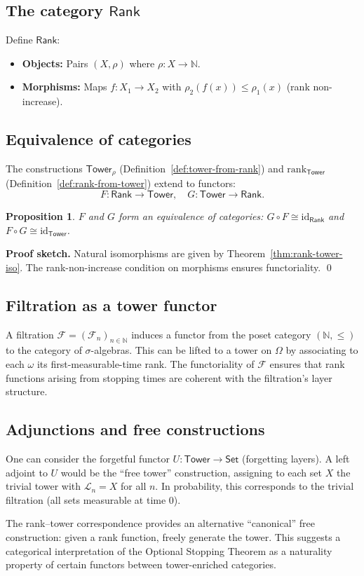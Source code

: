 \documentclass[11pt]{article}
\newtheorem{proposition}[theorem]{Proposition}
\theoremstyle{definition}
\theoremstyle{remark}
\newcommand{\layer}{\mathcal{L}}
\newcommand{\rank}{\mathrm{rank}}
\newcommand{\Tower}{\mathsf{Tower}}
\newcommand{\Filtration}{\mathcal{F}}
\newcommand{\NN}{\mathbb{N}}
\begin{document}
\subsection{The category $\mathsf{Rank}$}

Define $\mathsf{Rank}$:
\begin{itemize}
\item \textbf{Objects:} Pairs $(X, \rho)$ where $\rho: X \to \NN$.
\item \textbf{Morphisms:} Maps $f: X_1 \to X_2$ with $\rho_2(f(x)) \leq \rho_1(x)$ (rank non-increase).
\end{itemize}

\subsection{Equivalence of categories}

The constructions $\Tower_\rho$ (Definition~\ref{def:tower-from-rank}) and $\rank_\Tower$ (Definition~\ref{def:rank-from-tower}) extend to functors:
\[
F: \mathsf{Rank} \to \mathsf{Tower}, \quad G: \mathsf{Tower} \to \mathsf{Rank}.
\]

\begin{proposition}
\label{prop:equivalence}
$F$ and $G$ form an equivalence of categories: $G \circ F \cong \mathrm{id}_{\mathsf{Rank}}$ and $F \circ G \cong \mathrm{id}_{\mathsf{Tower}}$.
\end{proposition}

\noindent\textbf{Proof sketch.}
Natural isomorphisms are given by Theorem~\ref{thm:rank-tower-iso}.
The rank-non-increase condition on morphisms ensures functoriality.
\qed

\subsection{Filtration as a tower functor}

A filtration $\Filtration = (\Filtration_n)_{n \in \NN}$ induces a functor from the poset category $(\NN, \leq)$ to the category of $\sigma$-algebras.
This can be lifted to a tower on $\Omega$ by associating to each $\omega$ its first-measurable-time rank.
The functoriality of $\Filtration$ ensures that rank functions arising from stopping times are coherent with the filtration's layer structure.

\subsection{Adjunctions and free constructions}

One can consider the forgetful functor $U: \mathsf{Tower} \to \mathsf{Set}$ (forgetting layers).
A left adjoint to $U$ would be the ``free tower'' construction, assigning to each set $X$ the trivial tower with $\layer_n = X$ for all $n$.
In probability, this corresponds to the trivial filtration (all sets measurable at time 0).

The rank--tower correspondence provides an alternative ``canonical'' free construction: given a rank function, freely generate the tower.
This suggests a categorical interpretation of the Optional Stopping Theorem as a naturality property of certain functors between tower-enriched categories.
\end{document}
